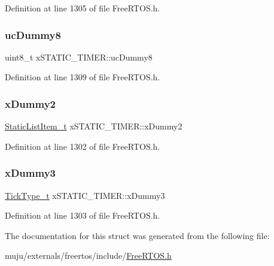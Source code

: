 Definition at line 1305 of file Free\+R\+T\+O\+S.\+h.

\mbox{\label{structx_s_t_a_t_i_c___t_i_m_e_r_a36a702a7e0e2fec558c8264ff3d88e93}} 
\subsubsection{\texorpdfstring{uc\+Dummy8}{ucDummy8}}
{\footnotesize\ttfamily uint8\+\_\+t x\+S\+T\+A\+T\+I\+C\+\_\+\+T\+I\+M\+E\+R\+::uc\+Dummy8}



Definition at line 1309 of file Free\+R\+T\+O\+S.\+h.

\mbox{\label{structx_s_t_a_t_i_c___t_i_m_e_r_a622e2e596e5829c9197bb44b9009474f}} 
\subsubsection{\texorpdfstring{x\+Dummy2}{xDummy2}}
{\footnotesize\ttfamily \hyperlink{externals_2freertos_2include_2_free_r_t_o_s_8h_a1d31bc0472385a87424518da484d9e09}{Static\+List\+Item\+\_\+t} x\+S\+T\+A\+T\+I\+C\+\_\+\+T\+I\+M\+E\+R\+::x\+Dummy2}



Definition at line 1302 of file Free\+R\+T\+O\+S.\+h.

\mbox{\label{structx_s_t_a_t_i_c___t_i_m_e_r_a60d582d1d0b5b9b15e8050d5ae29bc30}} 
\subsubsection{\texorpdfstring{x\+Dummy3}{xDummy3}}
{\footnotesize\ttfamily \hyperlink{externals_2freertos_2portable_2_g_c_c_2_a_r_m___c_m0_2portmacro_8h_aa69c48c6e902ce54f70886e6573c92a9}{Tick\+Type\+\_\+t} x\+S\+T\+A\+T\+I\+C\+\_\+\+T\+I\+M\+E\+R\+::x\+Dummy3}



Definition at line 1303 of file Free\+R\+T\+O\+S.\+h.



The documentation for this struct was generated from the following file\+:\begin{DoxyCompactItemize}
\item 
muju/externals/freertos/include/\hyperlink{externals_2freertos_2include_2_free_r_t_o_s_8h}{Free\+R\+T\+O\+S.\+h}\end{DoxyCompactItemize}
